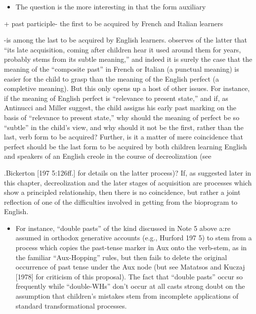 \begin{itemize}
\begin{itemize}
\begin{itemize}
\begin{itemize}
\begin{itemize}
\begin{itemize}
\begin{itemize}
\begin{itemize}
\item The question is the more interesting in that the form auxiliary
\end{itemize}

+ past participle- the first to be acquired by French and Italian learners

{}-is among the last to be acquired by English learners. \citet{Maratsos1979} observes of the latter that ``its late acquisition, coming after children hear it used around them for years, probably stems from its subtle meaning,'' and indeed it is surely the case that the meaning of the ``composite past'' in French or Italian (a punctual meaning) is easier for the child to grasp than the meaning of the English perfect (a com\-pletive meaning). But this only opens up a host of other issues. For instance, if the meaning of English perfect is ``relevance to present state,'' and if, as Antinucci and Miller suggest, the child assigns his early past marking on the basis of ``relevance to present state,'' why should the meaning of perfect be so ``subtle'' in the child's view, and why should it not be the first, rather than the last, verb form to be acquired? Further, is it a matter of mere coincidence that perfect should be the last form to be acquired by both children learning English and speakers of an English creole in the course of decreolization (see

.Bickerton [197 5:126ff.] for details on the latter process)? If, as suggested later in this chapter, decreolization and the later stages of acquisition are processes which show a principled relationship, then there is no coincidence, but rather a joint reflection of one of the difficulties involved in getting from the bioprogram to English.

\begin{itemize}
\item For instance, ``double pasts'' of the kind discussed in Note 5 above a:re assumed in orthodox generative accounts (e.g., Hurford 197 5) to stem from a process which copies the past-tense marker in Aux onto the verb-stem, as in the familiar ``Aux-Hopping'' rules, but then fails to delete the original occurrence of past tense under the Aux node (but see Matatsos and Kuczaj [1978] for criticism of this proposal). The fact that ``double pasts'' occur so frequently while ``double-WHs'' don't occur at all casts strong doubt on the assumption that children's mistakes stem from incomplete applications of standard transformational processes.
\end{itemize}


\end{itemize}
\end{itemize}
\end{itemize}
\end{itemize}
\end{itemize}
\end{itemize}
\end{itemize}
